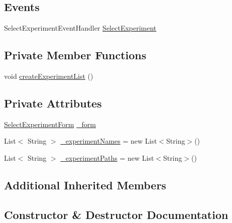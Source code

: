 \subsection*{Events}
\begin{DoxyCompactItemize}
\item 
Select\+Experiment\+Event\+Handler \hyperlink{class_web_analyzer_1_1_u_i_1_1_interaction_objects_1_1_select_experiment_control_a7062e7537081a90d11a7c26cefe79651}{Select\+Experiment}
\end{DoxyCompactItemize}
\subsection*{Private Member Functions}
\begin{DoxyCompactItemize}
\item 
void \hyperlink{class_web_analyzer_1_1_u_i_1_1_interaction_objects_1_1_select_experiment_control_a37e45871530bf2689954cba405277eb8}{create\+Experiment\+List} ()
\end{DoxyCompactItemize}
\subsection*{Private Attributes}
\begin{DoxyCompactItemize}
\item 
\hyperlink{class_web_analyzer_1_1_u_i_1_1_select_experiment_form}{Select\+Experiment\+Form} \hyperlink{class_web_analyzer_1_1_u_i_1_1_interaction_objects_1_1_select_experiment_control_ac6586d336cac091bf139064cf7a72a13}{\+\_\+form}
\item 
List$<$ String $>$ \hyperlink{class_web_analyzer_1_1_u_i_1_1_interaction_objects_1_1_select_experiment_control_a00919951dc14d3a906f7da01402894b1}{\+\_\+experiment\+Names} = new List$<$String$>$()
\item 
List$<$ String $>$ \hyperlink{class_web_analyzer_1_1_u_i_1_1_interaction_objects_1_1_select_experiment_control_a30f40ad6a4ba11a6cf945175cdda7f74}{\+\_\+experiment\+Paths} = new List$<$String$>$()
\end{DoxyCompactItemize}
\subsection*{Additional Inherited Members}


\subsection{Constructor \& Destructor Documentation}
\hypertarget{class_web_analyzer_1_1_u_i_1_1_interaction_objects_1_1_select_experiment_control_a0ec8c7149c5fc197768a0def5c1cf3ab}{}
